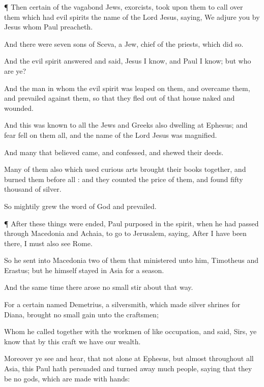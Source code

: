 {\par }{\PP {}¶
Then
certain
of the
vagabond
Jews,
exorcists, took upon
them to
call
over
them which
had
evil
spirits the
name of the
Lord
Jesus,
saying, We
adjure
you by
Jesus
whom
Paul
preacheth.

And there
were
seven
sons
of
{}
Sceva, a
Jew,
{} chief of the
priests, which
did
so.

And the
evil
spirit
answered and
said,
Jesus I
know,
and
Paul I
know;
but
who
are
ye?

And the
man
in
whom the
evil
spirit
was
leaped
on
them,
and
overcame
them, and
prevailed
against
them, so
that they
fled out
of
that
house
naked
and
wounded.

And
this
was
known to
all the
Jews
and
Greeks
also
dwelling at
Ephesus;
and
fear
fell
on
them
all,
and the
name of the
Lord
Jesus was
magnified.

And
many
that
believed
came,
and
confessed, and
shewed
their
deeds.

Many of
them also which
used curious
arts brought
their
books
together, and burned
them
before
all
{}:
and they
counted the
price of
them,
and
found
{}
fifty
thousand
{} of
silver.

So
mightily
grew the
word of
God
and
prevailed.


\par }{\PP {}¶
After these
things were
ended,
Paul
purposed
in the
spirit, when he had passed
through
Macedonia
and
Achaia, to
go
to
Jerusalem,
saying,
After
I have
been
there,
I
must
also
see
Rome.

So he
sent
into
Macedonia
two of
them that
ministered unto
him,
Timotheus
and
Erastus; but
he
himself
stayed
in
Asia for a
season.

And the
same
time there
arose
no
small
stir
about that
way.

For a
certain
{}
named
Demetrius, a
silversmith, which
made
silver
shrines for
Diana,
brought
no
small
gain unto the
craftsmen;

Whom he called
together
with the
workmen
of like
occupation, and
said,
Sirs, ye
know
that
by
this
craft we
have
our
wealth.

Moreover ye
see
and
hear,
that
not
alone at
Ephesus,
but
almost
throughout
all
Asia,
this
Paul hath
persuaded and turned
away
much
people,
saying
that they
be
no
gods,
which are
made with
hands:

}
